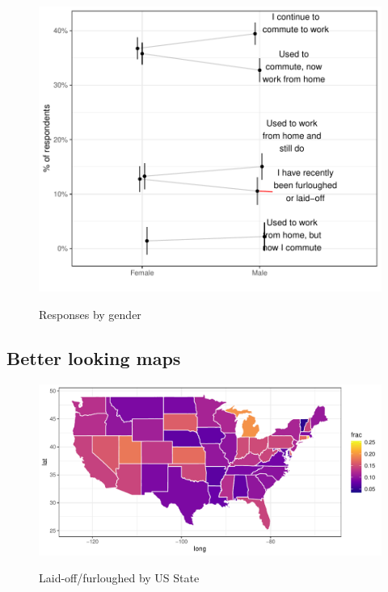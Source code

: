 \documentclass[12pt]{article}
\begin{document}
\begin{figure}
  \caption{Responses by gender} \label{fig:gender}
\centering
\begin{minipage}{1.0 \linewidth}
  \includegraphics[width = \linewidth]{plots/gender.pdf} \\
  \begin{footnotesize}
    \begin{singlespace}
    \end{singlespace}
    \end{footnotesize}
\end{minipage}
\end{figure} 

\subsection{Better looking maps} \label{sec:maps}

\begin{figure}
  \caption{Laid-off/furloughed by US State} \label{fig:gender}
\centering
\begin{minipage}{1.0 \linewidth}
  \includegraphics[width = \linewidth]{plots/geo_laidoff.pdf} \\
  \begin{footnotesize}
    \end{footnotesize}
\end{minipage}
\end{figure} 
\end{document}
